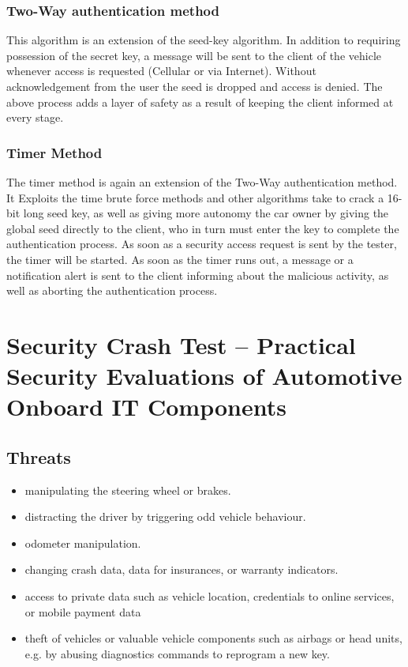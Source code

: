 \documentclass[11pt]{article}
\begin{document}
\subsubsection{Two-Way authentication method}

This algorithm is an extension of the seed-key algorithm. In addition to requiring possession of the secret key, a message will be sent to the client of the vehicle whenever access is requested (Cellular or via Internet). Without acknowledgement from the user the seed is dropped and access is denied. The above process adds a layer of safety as a result of keeping the client informed at every stage.

\subsubsection{Timer Method} 

The timer method is again an extension of the Two-Way authentication method. It Exploits the time brute force methods and other algorithms take to crack a 16-bit long seed key, as well as giving more autonomy the car owner by giving the global seed directly to the client, who in turn must enter the key to complete the authentication process. As soon as a security access request is sent by the tester, the timer will be started. As soon as the timer runs out, a message or a notification alert is sent to the client informing about the malicious activity, as well as aborting the authentication process.

\section{Security Crash Test – Practical Security Evaluations of Automotive Onboard IT Components}

\subsection{Threats}

\begin{itemize}
	\item manipulating the steering wheel or brakes.
	\item distracting the driver by triggering odd vehicle behaviour.
	\item odometer manipulation.
	\item changing crash data, data for insurances, or warranty indicators.
	\item access to private data such as vehicle location, credentials to online services, or mobile payment data
	\item theft of vehicles or valuable vehicle components such as airbags or head units, e.g. by abusing diagnostics commands to reprogram a new key.
\end{itemize}
\end{document}
